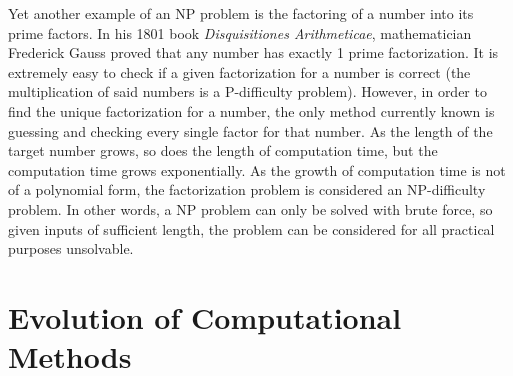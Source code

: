 \documentclass[10pt,journal,compsoc]{IEEEtran}
\begin{document}
Yet another example of an NP problem is the factoring of a number into its prime factors. In his 1801 book \textit{Disquisitiones Arithmeticae}, mathematician Frederick Gauss proved that any number has exactly 1 prime factorization\cite{Britannica}. It is extremely easy to check if a given factorization for a number is correct (the multiplication of said numbers is a P-difficulty problem). However, in order to find the unique factorization for a number, the only method currently known is guessing and checking every single factor for that number. As the length of the target number grows, so does the length of computation time, but the computation time grows exponentially. As the growth of computation time is not of a polynomial form, the factorization problem is considered an NP-difficulty problem. In other words, a NP problem can only be solved with brute force, so given inputs of sufficient length, the problem can be considered for all practical purposes unsolvable.



\section{Evolution of Computational Methods}
 
\end{document}
